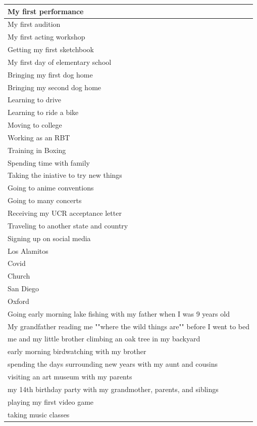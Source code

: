 \documentclass[
  .7em,
  letterpaper,
  DIV=11,
  numbers=noendperiod]{scrartcl}
\begin{document}
\begin{table}
\begin{tabular}{l}
\hline
My first performance\\
\hline
My first audition\\
\hline
My first acting workshop\\
\hline
Getting my first sketchbook\\
\hline
My first day of elementary school\\
\hline
Bringing my first dog home\\
\hline
Bringing my second dog home\\
\hline
Learning to drive\\
\hline
Learning to ride a bike\\
\hline
Moving to college\\
\hline
Working as an RBT\\
\hline
Training in Boxing\\
\hline
Spending time with family\\
\hline
Taking the iniative to try new things\\
\hline
Going to anime conventions\\
\hline
Going to many concerts\\
\hline
Receiving my UCR acceptance letter\\
\hline
Traveling to another state and country\\
\hline
Signing up on social media\\
\hline
Los Alamitos\\
\hline
Covid\\
\hline
Church\\
\hline
San Diego\\
\hline
Oxford\\
\hline
Going early morning lake fishing with my father when I was 9 years old\\
\hline
My grandfather reading me ""where the wild things are"" before I went to bed\\
\hline
me and my little brother climbing an oak tree in my backyard\\
\hline
early morning birdwatching with my brother\\
\hline
spending the days surrounding new years with my aunt and cousins\\
\hline
visiting an art museum with my parents\\
\hline
my 14th birthday party with my grandmother, parents, and siblings\\
\hline
playing my first video game\\
\hline
taking music classes\\

\end{tabular}
\end{table}
\end{document}
